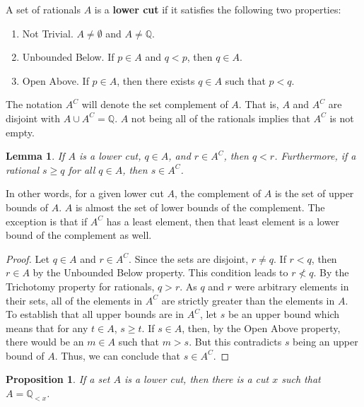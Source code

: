\documentclass{rmj-public}
\newtheorem{lemma}{Lemma}[section]
\newtheorem{proposition}{Proposition}[section]
\newcommand{\qcut}[2][x]{\ensuremath{\mathbb{Q}_{#2 #1}}}
\newcommand{\qlt}[1][x]{\qcut[#1]{<}}
\begin{document}
A set of rationals $A$ is a \textbf{lower cut} if it satisfies the following two properties: 
\begin{enumerate}
    \item Not Trivial. $A \neq \emptyset$ and $A \neq \mathbb{Q}$.
    \item Unbounded Below. If $p \in A$ and $q < p$, then $q \in A$. 
    \item Open Above. If $p \in A$, then there exists $q \in A$ such that $p < q$.
\end{enumerate}
The notation $A^C$ will denote the set complement of $A$. That is, $A$ and $A^C$ are disjoint with $A \cup A^C = \mathbb{Q}$. $A$ not being all of the rationals implies that $A^C$ is not empty. 

\begin{lemma}
    If $A$ is a lower cut, $q \in A$, and $r \in A^C$, then $q < r$. Furthermore, if a rational $s \geq q$ for all $q \in A$, then $s \in A^C$.
\end{lemma}

In other words, for a given lower cut $A$, the complement of $A$ is the set of upper bounds of $A$.  $A$ is almost the set of lower bounds of the complement. The exception is that if $A^C$ has a least element, then that least element is a lower bound of the complement as well. 

\begin{proof}
    Let $q \in A$ and $r \in A^C$. Since the sets are disjoint, $r \neq q$. If $r < q$, then $r \in A$ by the Unbounded Below property. This condition leads to $r \nless q$. By the Trichotomy property for rationals, $q > r$. As $q$ and $r$ were arbitrary elements in their sets, all of the elements in $A^C$ are strictly greater than the elements in $A$. To establish that all upper bounds are in $A^C$, let $s$ be an upper bound which means that for any $t \in A$, $s \geq t$. If $s \in A$, then, by the Open Above property, there would be an $m \in A$ such that $m > s$. But this contradicts $s$ being an upper bound of $A$. Thus, we can conclude that $s \in A^C$. 
\end{proof}


\begin{proposition}
    If a set $A$ is a lower cut, then there is a cut $x$ such that $A = \qlt$.
\end{proposition}
\end{document}
